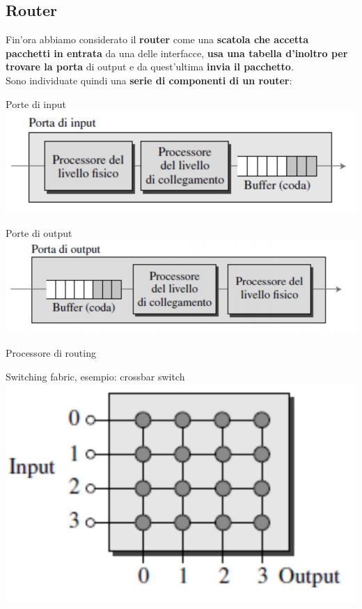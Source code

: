 \documentclass[10pt]{article}
\begin{document}
\subsection{Router}
Fin'ora abbiamo considerato il \textbf{router} come una \textbf{scatola che accetta pacchetti in entrata} da una delle interfacce, \textbf{usa una tabella d'inoltro per trovare la porta} di output e da quest'ultima \textbf{invia il pacchetto}.\\
Sono individuate quindi una \textbf{serie di componenti di un router}:
\begin{list}{}{}
\item Porte di input\\
\includegraphics[scale=0.33]{routerportain.png}
\item Porte di output\\
\includegraphics[scale=0.33]{routerportaout.png}
\item Processore di routing
\item Switching fabric, esempio: crossbar switch\\
\includegraphics[scale=0.33]{routerswitchfabric.png}
\end{list}
\end{document}
